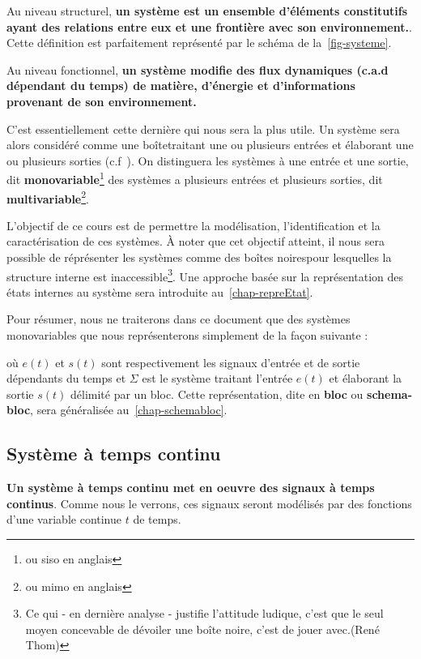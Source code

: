 Au niveau structurel, \textbf{un système est un ensemble 
d'éléments constitutifs ayant des relations entre eux et 
une frontière avec son environnement.}. Cette définition est parfaitement
représenté par le schéma de la~\cref{fig-systeme}.

Au niveau fonctionnel, \textbf{un système modifie des flux dynamiques 
(c.a.d dépendant du temps) de matière, d'énergie et d'informations provenant 
de son environnement.}

C'est essentiellement cette dernière qui nous sera la plus utile.
Un système sera alors considéré comme 
une \og boîte\fg traitant une ou plusieurs entrées et élaborant une ou 
plusieurs sorties (c.f~). On distinguera les systèmes à 
une entrée et une sortie, dit \textbf{monovariable}\footnote{ou \gls{siso} 
en anglais} des systèmes  a plusieurs entrées et plusieurs sorties, dit 
\textbf{multivariable}\footnote{ou \gls{mimo} en anglais}.

L'objectif de ce cours est de permettre la modélisation, 
l'identification et la caractérisation de ces systèmes. 
\`A noter que cet objectif atteint, il nous sera possible de réprésenter 
les systèmes comme des \og boîtes noires\fg pour lesquelles la structure 
interne est inaccessible\footnote{\og Ce qui - en dernière analyse - justifie 
l'attitude ludique, c'est que le seul moyen concevable de dévoiler une 
boîte noire, c'est de jouer avec.\fg (René Thom)}. Une approche basée 
sur la représentation des états internes au système sera 
introduite au~\cref{chap-repreEtat}. 

Pour résumer, nous ne traiterons dans ce document 
que des systèmes monovariables que 
nous représenterons simplement de la façon suivante :
\begin{center}
    
\end{center}
où $e(t)$ et $s(t)$ sont respectivement les signaux d'entrée et de sortie 
dépendants du temps et $\Sigma$ est le système traitant l'entrée $e(t)$ et 
élaborant la sortie $s(t)$ délimité par un bloc. 
Cette représentation, dite en \textbf{bloc} ou 
\textbf{schema-bloc}, sera généralisée au~\cref{chap-schemabloc}.
\clearpage
\subsection{Système à temps continu}
\textbf{Un système à temps continu met en oeuvre des signaux 
à temps continus}. Comme nous le verrons, ces signaux seront
modélisés par des fonctions d'une variable continue $t$ de temps.

